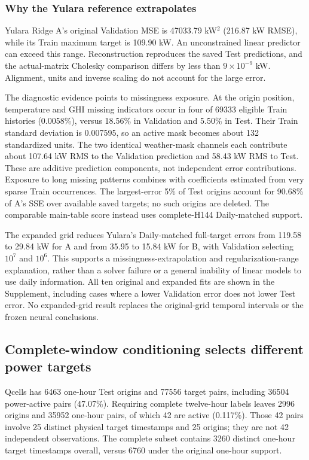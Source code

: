 \documentclass[aip,reprint,floatfix,amsmath,amssymb]{revtex4-2}
\begin{document}
\subsubsection{Why the Yulara reference extrapolates}
Yulara Ridge A's original Validation MSE is 47033.79 kW$^2$ (216.87 kW RMSE), while its Train maximum target is 109.90 kW. An unconstrained linear predictor can exceed this range. Reconstruction reproduces the saved Test predictions, and the actual-matrix Cholesky comparison differs by less than $9\times10^{-9}$ kW. Alignment, units and inverse scaling do not account for the large error.

The diagnostic evidence points to missingness exposure. At the origin position, temperature and GHI missing indicators occur in four of 69333 eligible Train histories (0.0058\%), versus 18.56\% in Validation and 5.50\% in Test. Their Train standard deviation is 0.007595, so an active mask becomes about 132 standardized units. The two identical weather-mask channels each contribute about 107.64 kW RMS to the Validation prediction and 58.43 kW RMS to Test. These are additive prediction components, not independent error contributions. Exposure to long missing patterns combines with coefficients estimated from very sparse Train occurrences. The largest-error 5\% of Test origins account for 90.68\% of A's SSE over available saved targets; no such origins are deleted. The comparable main-table score instead uses complete-H144 Daily-matched support.

The expanded grid reduces Yulara's Daily-matched full-target errors from 119.58 to 29.84 kW for A and from 35.95 to 15.84 kW for B, with Validation selecting $10^7$ and $10^6$. This supports a missingness-extrapolation and regularization-range explanation, rather than a solver failure or a general inability of linear models to use daily information. All ten original and expanded fits are shown in the Supplement, including cases where a lower Validation error does not lower Test error. No expanded-grid result replaces the original-grid temporal intervals or the frozen neural conclusions.

\subsection{Complete-window conditioning selects different power targets}
Qcells has 6463 one-hour Test origins and 77556 target pairs, including 36504 power-active pairs (47.07\%). Requiring complete twelve-hour labels leaves 2996 origins and 35952 one-hour pairs, of which 42 are active (0.117\%). Those 42 pairs involve 25 distinct physical target timestamps and 25 origins; they are not 42 independent observations. The complete subset contains 3260 distinct one-hour target timestamps overall, versus 6760 under the original one-hour support.
\end{document}
